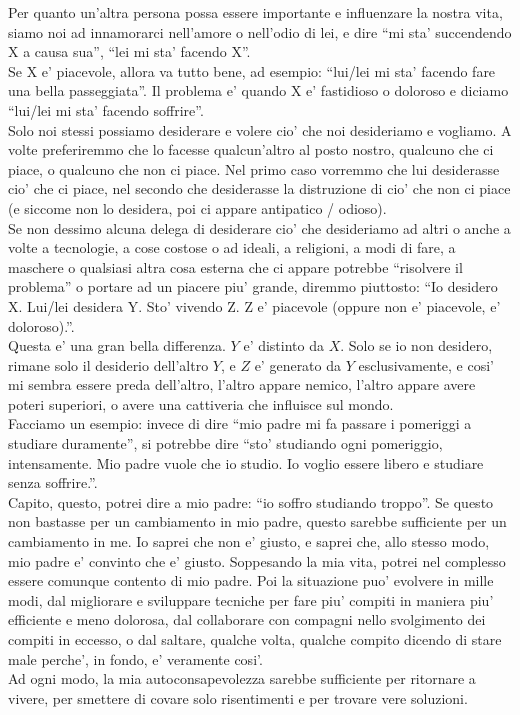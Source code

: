 Per quanto un'altra persona possa essere importante e influenzare la nostra vita, siamo noi ad innamorarci nell'amore o nell'odio di lei, e dire ``mi sta' succendendo X a causa sua'', ``lei mi sta' facendo X''.\\
Se X e' piacevole, allora va tutto bene, ad esempio: ``lui/lei mi sta' facendo fare una bella passeggiata''. Il problema e' quando X e' fastidioso o doloroso e diciamo ``lui/lei mi sta' facendo soffrire''.\\
Solo noi stessi possiamo desiderare e volere cio' che noi desideriamo e vogliamo. A volte preferiremmo che lo facesse qualcun'altro al posto nostro, qualcuno che ci piace, o qualcuno che non ci piace. Nel primo caso vorremmo che lui desiderasse cio' che ci piace, nel secondo che desiderasse la distruzione di cio' che non ci piace (e siccome non lo desidera, poi ci appare antipatico / odioso).\\
Se non dessimo alcuna delega di desiderare cio' che desideriamo ad altri o anche a volte a tecnologie, a cose costose o ad ideali, a religioni, a modi di fare, a maschere o qualsiasi altra cosa esterna che ci appare potrebbe ``risolvere il problema'' o portare ad un piacere piu' grande,  diremmo piuttosto: ``Io desidero X. Lui/lei desidera Y. Sto' vivendo Z. Z e' piacevole (oppure non e' piacevole, e' doloroso).''.\\
Questa e' una gran bella differenza. $Y$ e' distinto da $X$. Solo se io non desidero, rimane solo il desiderio dell'altro $Y$, e $Z$ e' generato da $Y$ esclusivamente, e cosi' mi sembra essere preda dell'altro, l'altro appare nemico, l'altro appare avere poteri superiori, o avere una cattiveria che influisce sul mondo.\\
Facciamo un esempio: invece di dire ``mio padre mi fa passare i pomeriggi a studiare duramente'', si potrebbe dire ``sto' studiando ogni pomeriggio, intensamente. Mio padre vuole che io studio. Io voglio essere libero e studiare senza soffrire.''. \\
Capito, questo, potrei dire a mio padre: ``io soffro studiando troppo''. Se questo non bastasse per un cambiamento in mio padre, questo sarebbe sufficiente per un cambiamento in me. Io saprei che non e' giusto, e saprei che, allo stesso modo, mio padre e' convinto che e' giusto. Soppesando la mia vita, potrei nel complesso essere comunque contento di mio padre. Poi la situazione puo' evolvere in mille modi, dal migliorare e sviluppare tecniche per fare piu' compiti in maniera piu' efficiente e meno dolorosa, dal collaborare con compagni nello svolgimento dei compiti in eccesso, o dal saltare, qualche volta, qualche compito dicendo di stare male perche', in fondo, e' veramente cosi'. \\
Ad ogni modo, la mia autoconsapevolezza sarebbe sufficiente per ritornare a vivere, per smettere di covare solo risentimenti e per trovare vere soluzioni.\\

